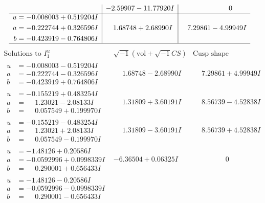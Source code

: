 \documentclass[1p]{elsarticle_modified}
\theoremstyle{definition}
\newcommand{\I}{\sqrt{-1}}
\begin{document}
$$\begin{array}{c|c|c}
 & -2.59907 - 11.77920 I & \phantom{-0.000000 } 0 \\ \hline\begin{aligned}
u &= -0.008003 + 0.519204 I \\
a &= -0.222744 + 0.326596 I \\
b &= -0.423919 - 0.764806 I\end{aligned}
 & \phantom{-}1.68748 + 2.68990 I & \phantom{-}7.29861 - 4.99949 I\\
 \hline 
 \end{array}$$\newpage$$\begin{array}{c|c|c}  
\text{Solutions to }I^u_{1}& \I (\text{vol} + \sqrt{-1}CS) & \text{Cusp shape}\\
 \hline 
\begin{aligned}
u &= -0.008003 - 0.519204 I \\
a &= -0.222744 - 0.326596 I \\
b &= -0.423919 + 0.764806 I\end{aligned}
 & \phantom{-}1.68748 - 2.68990 I & \phantom{-}7.29861 + 4.99949 I \\ \hline\begin{aligned}
u &= -0.155219 + 0.483254 I \\
a &= \phantom{-}1.23021 - 2.08133 I \\
b &= \phantom{-}0.057549 + 0.199970 I\end{aligned}
 & \phantom{-}1.31809 + 3.60191 I & \phantom{-}8.56739 - 4.52838 I \\ \hline\begin{aligned}
u &= -0.155219 - 0.483254 I \\
a &= \phantom{-}1.23021 + 2.08133 I \\
b &= \phantom{-}0.057549 - 0.199970 I\end{aligned}
 & \phantom{-}1.31809 - 3.60191 I & \phantom{-}8.56739 + 4.52838 I \\ \hline\begin{aligned}
u &= -1.48126 + 0.20586 I \\
a &= -0.0592996 + 0.0998339 I \\
b &= \phantom{-}0.290001 + 0.656433 I\end{aligned}
 & -6.36504 + 0.06325 I & \phantom{-0.000000 } 0 \\ \hline\begin{aligned}
u &= -1.48126 - 0.20586 I \\
a &= -0.0592996 - 0.0998339 I \\
b &= \phantom{-}0.290001 - 0.656433 I\end{aligned}

\end{array}$$
\end{document}
